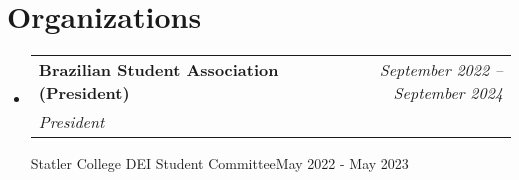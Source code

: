 \documentclass[letterpaper,11pt]{article}
\makeatletter
\newcommand{\resumeOrganizationHeading}[4]{
  \vspace{-2pt}\item
    \begin{tabular*}{0.97\textwidth}[t]{l@{\extracolsep{\fill}}r}
      \textbf{#1} & \textit{\small #2} \\
      \textit{\small#3}
    \end{tabular*}\vspace{-7pt}
}
\newcommand{\resumeSubHeadingListStart}{\begin{itemize}[leftmargin=0.15in, label={}]}
\newcommand{\resumeSubHeadingListEnd}{\end{itemize}}
\makeatother
\begin{document}
    
    




 \section{Organizations}
   \resumeSubHeadingListStart
    
     \resumeOrganizationHeading
       {Brazilian Student Association (President)}{September 2022 -- September 2024}{President}
     \resumeOrganizationHeading
       {Statler College DEI Student Committee}{May 2022 - May 2023}
    
   \resumeSubHeadingListEnd








    



\end{document}
